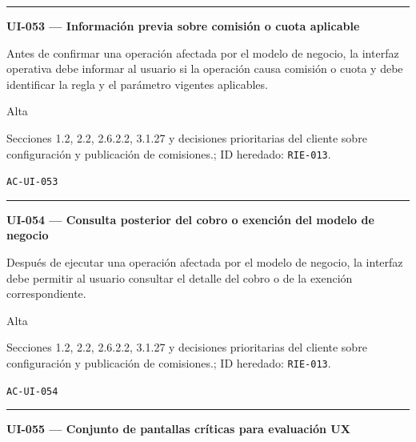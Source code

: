 \documentclass[10pt,letterpaper]{article}
\begin{document}
\vspace{0.25em}\hrule\vspace{0.65em}
\noindent\textbf{UI-053 --- Información previa sobre comisión o cuota aplicable}\par
\begin{description}[style=nextline,leftmargin=3.15cm,labelwidth=2.8cm,font=\normalfont\bfseries]
\item[Obligación] Antes de confirmar una operación afectada por el modelo de negocio, la interfaz operativa debe informar al usuario si la operación causa comisión o cuota y debe identificar la regla y el parámetro vigentes aplicables.
\item[Prioridad] Alta
\item[Procedencia] Secciones 1.2, 2.2, 2.6.2.2, 3.1.27 y decisiones prioritarias del cliente sobre configuración y publicación de comisiones.; ID heredado: \texttt{RIE-013}.
\item[Verificación] \texttt{AC-UI-053}
\end{description}
\vspace{0.25em}\hrule\vspace{0.65em}
\noindent\textbf{UI-054 --- Consulta posterior del cobro o exención del modelo de negocio}\par
\begin{description}[style=nextline,leftmargin=3.15cm,labelwidth=2.8cm,font=\normalfont\bfseries]
\item[Obligación] Después de ejecutar una operación afectada por el modelo de negocio, la interfaz debe permitir al usuario consultar el detalle del cobro o de la exención correspondiente.
\item[Prioridad] Alta
\item[Procedencia] Secciones 1.2, 2.2, 2.6.2.2, 3.1.27 y decisiones prioritarias del cliente sobre configuración y publicación de comisiones.; ID heredado: \texttt{RIE-013}.
\item[Verificación] \texttt{AC-UI-054}
\end{description}
\vspace{0.25em}\hrule\vspace{0.65em}
\noindent\textbf{UI-055 --- Conjunto de pantallas críticas para evaluación UX}\par
\end{document}
